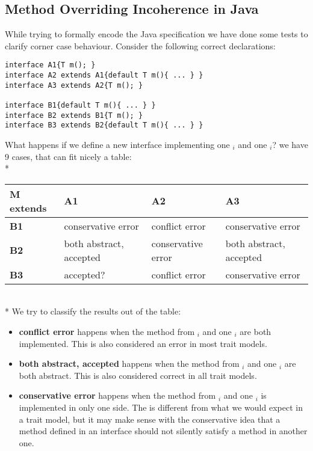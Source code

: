 \subsection{Method Overriding Incoherence in Java}
While trying to formally encode the Java specification we have done some tests to clarify corner case behaviour.
Consider the following correct declarations:
\begin{lstlisting}
interface A1{T m(); }
interface A2 extends A1{default T m(){ ... } }
interface A3 extends A2{T m(); } 

interface B1{default T m(){ ... } }
interface B2 extends B1{T m(); }
interface B3 extends B2{default T m(){ ... } }
\end{lstlisting}

What happens if we define a new interface \Q@M@ implementing one \Q@A@${}_i$ and one \Q@B@${}_i$? we have 9 cases, that can fit nicely a table:\\*
\noindent
\begin{tabular}{|l|l|l|l|}
\hline
\textbf{M extends} & \textbf{A1}                  & \textbf{A2} & \textbf{A3} \\ \hline
\textbf{B1}        & conservative error                        & conflict error      & conservative error       \\ \hline
\textbf{B2}        & both abstract, accepted                        & conservative error       & both abstract, accepted       \\ \hline
\textbf{B3}        & \cellcolor[HTML]{C0C0C0} accepted? &conflict  error       & conservative error      \\ \hline
\end{tabular}
\\*
We try to classify the results out of the table:
\begin{itemize}
\item \textbf{conflict error} happens when the method from \Q@A@${}_i$ and one \Q@B@${}_i$ are both implemented. This is also considered an error in most trait models.
\item \textbf{both abstract, accepted} happens when the method from \Q@A@${}_i$ and one \Q@B@${}_i$ are both abstract. This is also considered correct in all trait models.
\item \textbf{conservative error}
 happens when the method from \Q@A@${}_i$ and one \Q@B@${}_i$ is implemented in only one side.
The is different from what we would expect in a trait model, but it may make sense with the conservative idea that a method defined in an interface
should not silently satisfy a method in another one.
\end{itemize}

